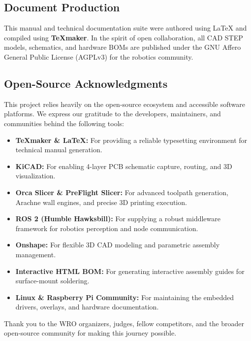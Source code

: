 \documentclass[12pt,a4paper]{article}
\begin{document}
\subsection{Document Production}
This manual and technical documentation suite were authored using \LaTeX{} and compiled using \textbf{TeXmaker}. In the spirit of open collaboration, all CAD STEP models, schematics, and hardware BOMs are published under the GNU Affero General Public License (AGPLv3) for the robotics community.

\subsection{Open-Source Acknowledgments}
This project relies heavily on the open-source ecosystem and accessible software platforms. We express our gratitude to the developers, maintainers, and communities behind the following tools:

\begin{itemize}
    \item \textbf{TeXmaker \& \LaTeX{}:} For providing a reliable typesetting environment for technical manual generation.
    \item \textbf{KiCAD:} For enabling 4-layer PCB schematic capture, routing, and 3D visualization.
    \item \textbf{Orca Slicer \& PreFlight Slicer:} For advanced toolpath generation, Arachne wall engines, and precise 3D printing execution.
    \item \textbf{ROS 2 (Humble Hawksbill):} For supplying a robust middleware framework for robotics perception and node communication.
    \item \textbf{Onshape:} For flexible 3D CAD modeling and parametric assembly management.
    \item \textbf{Interactive HTML BOM:} For generating interactive assembly guides for surface-mount soldering.
    \item \textbf{Linux \& Raspberry Pi Community:} For maintaining the embedded drivers, overlays, and hardware documentation.
\end{itemize}

Thank you to the WRO organizers, judges, fellow competitors, and the broader open-source community for making this journey possible.
\end{document}
